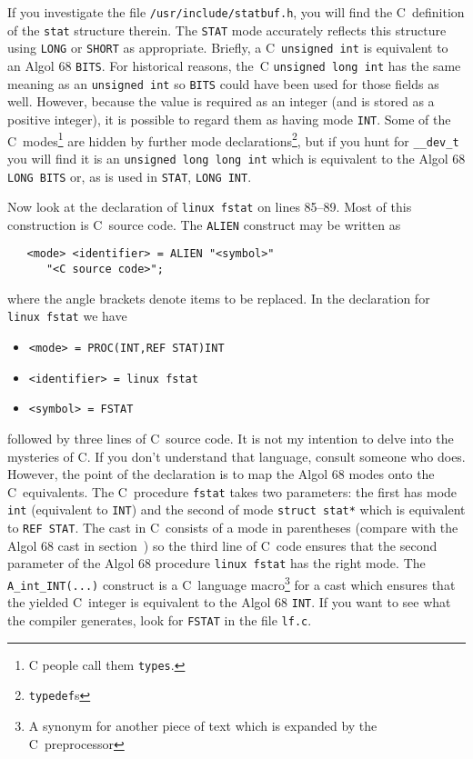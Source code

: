If you investigate the file \verb|/usr/include/statbuf.h|, you will
find the C~definition of the \verb|stat| structure therein. The
\verb|STAT| mode accurately reflects this structure using \verb|LONG|
or \verb|SHORT| as appropriate. Briefly, a C~\verb|unsigned int| is
equivalent to an Algol 68 \verb|BITS|. For historical reasons, the~C
\verb|unsigned long int| has the same meaning as an
\verb|unsigned int| so \verb|BITS| could have been used for those
fields as well.  However, because the value is required as an integer
(and is stored as a positive integer), it is possible to regard them
as having mode \verb|INT|. Some of the C~modes\footnote{C people call
them \texttt{types}.} are hidden by further mode
declarations\footnote{\texttt{typedef}s}, but if you hunt for
\verb|__dev_t| you will find it is an \verb|unsigned long long int|
which is equivalent to the Algol 68 \verb|LONG BITS| or, as is used
in \verb|STAT|, \verb|LONG INT|.

Now look at the declaration of \verb|linux fstat| on lines 85--89.
Most of this construction is C~source code. The \verb|ALIEN|
construct may be written as
\begin{verbatim}
   <mode> <identifier> = ALIEN "<symbol>"
      "<C source code>";
\end{verbatim}
\noindent
where the angle brackets denote items to be replaced. In the
declaration for \verb|linux fstat| we have
\begin{itemize}
\item \verb|<mode> = PROC(INT,REF STAT)INT|
\item \verb|<identifier> = linux fstat|
\item \verb|<symbol> = FSTAT|
\end{itemize}
followed by three lines of C~source code. It is not my intention to
delve into the mysteries of C. If you don't understand that language,
consult someone who does. However, the point of the declaration is to
map the Algol 68 modes onto the C~equivalents. The C~procedure
\verb|fstat| takes two parameters: the first has mode \verb|int|
(equivalent to \verb|INT|) and the second of mode \verb|struct stat*|
which is equivalent to \verb|REF STAT|. The cast in C~consists of a
mode in parentheses (compare with the Algol 68 cast in
section~) so the third line of C~code ensures that
the second parameter of the Algol 68 procedure \verb|linux fstat| has
the right mode. The \verb|A_int_INT(...)| construct is a C~language
macro\footnote{A synonym for another piece of text which is expanded
by the C~preprocessor} for a cast which ensures that the yielded
C~integer is equivalent to the Algol 68 \verb|INT|.  If you want to
see what the  compiler
generates, look for \verb|FSTAT| in the file \verb|lf.c|.

